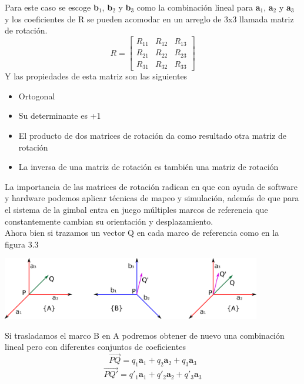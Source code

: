 Para este caso se escoge \textbf{b}$_1$, \textbf{b}$_2$ y \textbf{b}$_3$ como la combinación
lineal para \textbf{a}$_1$, \textbf{a}$_2$ y \textbf{a}$_3$ y los coeficientes de R se
pueden acomodar en un arreglo de 3x3 llamada matriz de rotación.
\begin{equation}
	R=
	\begin{bmatrix}
		R_{11} & R_{12} & R_{13} \\
		R_{21} & R_{22} & R_{23} \\
		R_{31} & R_{32} & R_{33}
	\end{bmatrix}
\end{equation}
Y las propiedades de esta matriz son las siguientes
\begin{itemize}
	\item Ortogonal
	\item Su determinante es +1
	\item El producto de dos matrices de rotación da como resultado otra matriz de rotación
	\item La inversa de una matriz de rotación es también una matriz de rotación
\end{itemize}
La importancia de las matrices de rotación radican en que con ayuda de software y hardware
podemos aplicar técnicas de mapeo y simulación, además de que para el sistema de la gimbal
entra en juego múltiples marcos de referencia que constantemente cambian su orientación y
desplazamiento.\\
Ahora bien si trazamos un vector Q en cada marco de referencia como en la figura 3.3
\begin{center}
	\includegraphics[width=0.85\textwidth]{Contenido/Cuerpo/Capitulo3/Fig12.eps}
	\label{fig:ModeloMat:Fig1}
\end{center}
Si trasladamos el marco B en A podremos obtener de nuevo una combinación lineal pero con
diferentes conjuntos de coeficientes
\begin{equation}
	\overrightarrow{PQ} = q_1\textbf{a}_1 + q_2\textbf{a}_2 + q_3\textbf{a}_3
\end{equation}
\begin{equation}
	\overrightarrow{PQ'} = q'_1\textbf{a}_1 + q'_2\textbf{a}_2 + q'_3\textbf{a}_3
\end{equation}
